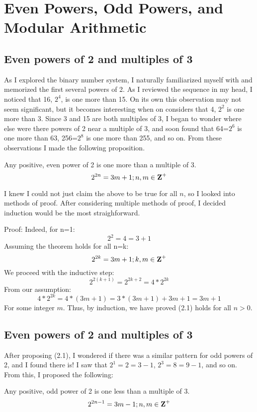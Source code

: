 \section{Even Powers, Odd Powers, and Modular Arithmetic}

\subsection{Even powers of 2 and multiples of 3}
As I explored the binary number system, I naturally familiarized myself with and memorized the first several powers of 2. As I reviewed the sequence in my head, I noticed that 16, $2^4$, is one more than 15. On its own this observation may not seem significant, but it becomes interesting when on considers that 4, $2^2$ is one more than 3.
Since 3 and 15 are both multiples of 3, I began to wonder where else were there powers of 2 near a multiple of 3, and soon found that 64=$2^6$ is one more than 63, 256=$2^8$ is one more than 255, and so on. From these observations I made the following proposition.
\begin{theorem}
    Any positive, even power of 2 is one more than a multiple of 3. 
    $$2^{2n}=3m+1;n,m\in\mbox{\textbf{Z}}^+$$
\end{theorem}

I knew I could not just claim the above to be true for all $n$, so I looked into methods of proof. After considering multiple methods of proof, I decided induction would be the most straighforward. 

Proof: Indeed, for n=1:
$$2^2=4=3+1$$
Assuming the theorem holds for all n=k:
$$2^{2k}=3m+1;k,m\in\mbox{\textbf{Z}}^+$$
We proceed with the inductive step:
$$2^{2(k+1)}=2^{2k+2}=4*2^{2k}$$
From our assumption:
$$4*2^{2k}=4*(3m+1)=3*(3m+1)+3m+1=3m+1$$
For some integer $m$. Thus, by induction, we have proved (2.1) holds for all $n>0$.

\subsection{Even powers of 2 and multiples of 3}
After proposing (2.1), I wondered if there was a similar pattern for odd powers of 2, and I found there is! I saw that $2^1=2=3-1$, $2^3=8=9-1$, and so on. From this, I proposed the following:
\begin{theorem}
    Any positive, odd power of 2 is one less than a multiple of 3. 
    $$2^{2n-1}=3m-1;n,m\in\mbox{\textbf{Z}}^+$$
\end{theorem}


